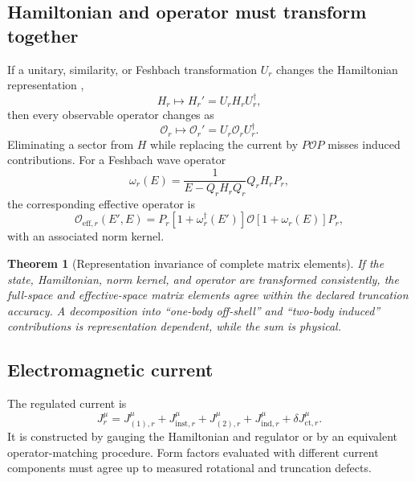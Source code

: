 \documentclass[11pt]{article}
\newtheorem{theorem}[definition]{Theorem}
\newcommand{\cO}{\mathcal O}
\newcommand{\eff}{\mathrm{eff}}
\newcommand{\ind}{\mathrm{ind}}
\newcommand{\ct}{\mathrm{ct}}
\newcommand{\inst}{\mathrm{inst}}
\begin{document}
\subsection{Hamiltonian and operator must transform together}

If a unitary, similarity, or Feshbach transformation \(U_r\) changes the
Hamiltonian representation \cite{Feshbach1958,Okubo1954,LeeSuzuki1980,GlazekWilson1993},
\begin{equation}
 H_r\mapsto H_r'=U_rH_rU_r^\dagger,
 \label{eq:ham-transform}
\end{equation}
then every observable operator changes as
\begin{equation}
 \cO_r\mapsto\cO_r'=U_r\cO_rU_r^\dagger.
 \label{eq:operator-transform}
\end{equation}
Eliminating a sector from \(H\) while replacing the current by \(P\cO P\)
misses induced contributions.  For a Feshbach wave operator
\begin{equation}
 \omega_r(E)=\frac{1}{E-Q_rH_rQ_r}Q_rH_rP_r,
 \label{eq:wave-operator}
\end{equation}
the corresponding effective operator is
\begin{equation}
 \cO_{\eff,r}(E',E)
 =P_r\left[1+\omega_r^\dagger(E')\right]
 \cO
 \left[1+\omega_r(E)\right]P_r,
 \label{eq:feshbach-operator}
\end{equation}
with an associated norm kernel.

\begin{theorem}[Representation invariance of complete matrix elements]
If the state, Hamiltonian, norm kernel, and operator are transformed
consistently, the full-space and effective-space matrix elements agree within
the declared truncation accuracy.  A decomposition into ``one-body off-shell''
and ``two-body induced'' contributions is representation dependent, while the
sum is physical.
\label{thm:representation-invariance}
\end{theorem}

\subsection{Electromagnetic current}

The regulated current is
\begin{equation}
 J_r^\mu
 =J_{(1),r}^\mu
 +J_{\inst,r}^\mu
 +J_{(2),r}^\mu
 +J_{\ind,r}^\mu
 +\delta J_{\ct,r}^\mu.
 \label{eq:em-current}
\end{equation}
It is constructed by gauging the Hamiltonian and regulator or by an equivalent
operator-matching procedure.  Form factors evaluated with different current
components must agree up to measured rotational and truncation defects.
\end{document}
